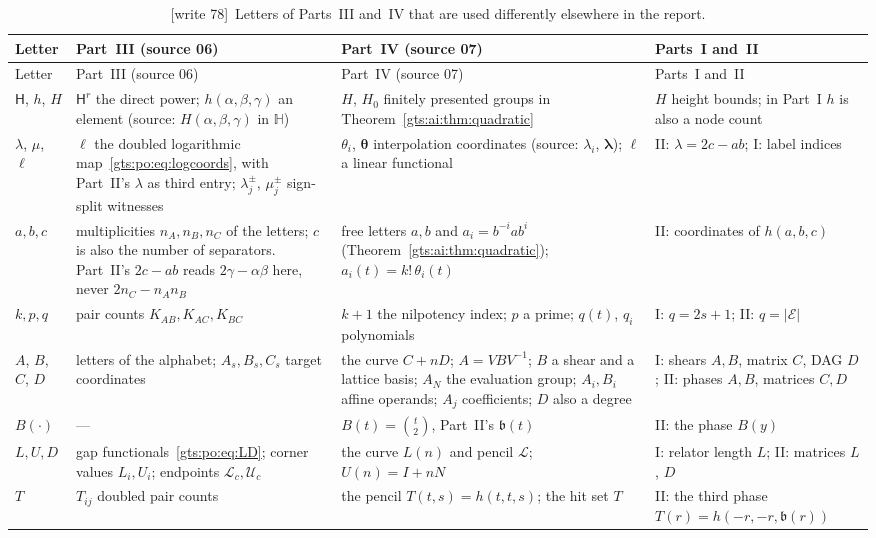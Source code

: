 \documentclass[11pt,letterpaper]{article}
\theoremstyle{definition}
\theoremstyle{remark}
\newcommand{\HH}{\mathsf H}
\newcommand{\bn}{\mathfrak b}
\newcommand{\low}{\mathcal L}
\newcommand{\up}{\mathcal U}
\newcommand{\vv}{\boldsymbol\theta}
\newcommand{\wtagb}{\textup{[write 78]}}
\begin{document}
\begin{center}
\small
\begin{longtable}{@{}L{.09\textwidth}L{.27\textwidth}L{.31\textwidth}L{.21\textwidth}@{}}
\caption{\wtagb\ Letters of Parts~III and~IV that are used differently elsewhere in the report.}\label{gts:tab:letters78}\\
\toprule
Letter & Part~III (source 06) & Part~IV (source 07) & Parts~I and~II\\
\midrule
\endfirsthead
\toprule
Letter & Part~III (source 06) & Part~IV (source 07) & Parts~I and~II\\
\midrule
\endhead
$\HH$, $h$, $H$ & $\HH^r$ the direct power; $h(\alpha,\beta,\gamma)$ an element (source: $H(\alpha,\beta,\gamma)$ in $\mathbb H$) & $H$, $H_0$ finitely presented groups in Theorem~\ref{gts:ai:thm:quadratic} & $H$ height bounds; in Part~I $h$ is also a node count\\
$\lambda$, $\mu$, $\ell$ & $\ell$ the doubled logarithmic map~\eqref{gts:po:eq:logcoords}, with Part~II's $\lambda$ as third entry; $\lambda_j^\pm$, $\mu_j^\pm$ sign-split witnesses & $\theta_i$, $\vv$ interpolation coordinates (source: $\lambda_i$, $\boldsymbol\lambda$); $\ell$ a linear functional & II: $\lambda=2c-ab$; I: label indices\\
$a,b,c$ & multiplicities $n_A,n_B,n_C$ of the letters; $c$ is also the number of separators. Part~II's $2c-ab$ reads $2\gamma-\alpha\beta$ here, never $2n_C-n_An_B$ & free letters $a,b$ and $a_i=b^{-i}ab^i$ (Theorem~\ref{gts:ai:thm:quadratic}); $a_i(t)=k!\,\theta_i(t)$ & II: coordinates of $h(a,b,c)$\\
$k,p,q$ & pair counts $K_{AB},K_{AC},K_{BC}$ & $k+1$ the nilpotency index; $p$ a prime; $q(t)$, $q_i$ polynomials & I: $q=2s+1$; II: $q=|\mathcal E|$\\
$A$, $B$, $C$, $D$ & letters of the alphabet; $A_s,B_s,C_s$ target coordinates & the curve $C+nD$; $A=VBV^{-1}$; $B$ a shear and a lattice basis; $A_N$ the evaluation group; $A_i,B_i$ affine operands; $A_j$ coefficients; $D$ also a degree & I: shears $A,B$, matrix $C$, DAG $D$; II: phases $A,B$, matrices $C,D$\\
$B(\cdot)$ & --- & $B(t)=\binom t2$, Part~II's $\bn(t)$ & II: the phase $B(y)$\\
$L,U,D$ & gap functionals~\eqref{gts:po:eq:LD}; corner values $L_i,U_i$; endpoints $\low_c,\up_c$ & the curve $L(n)$ and pencil $\mathcal L$; $U(n)=I+nN$ & I: relator length $L$; II: matrices $L$, $D$\\
$T$ & $T_{ij}$ doubled pair counts & the pencil $T(t,s)=h(t,t,s)$; the hit set $T$ & II: the third phase $T(r)=h(-r,-r,\bn(r))$\\

\end{longtable}
\end{center}
\end{document}
